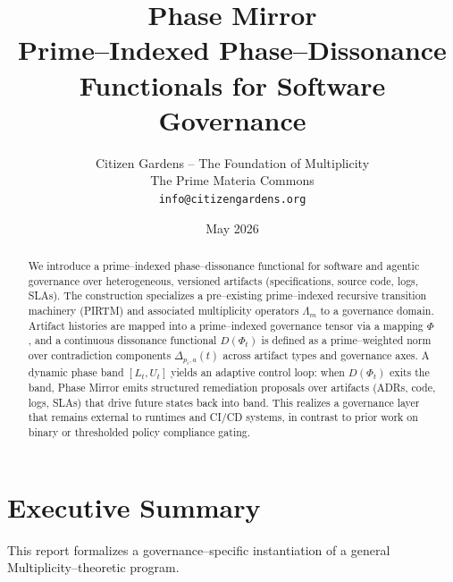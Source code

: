 \documentclass[11pt]{article}
\title{\Huge{Phase Mirror} \\ \Large\textbf{Prime–Indexed Phase--Dissonance} \\
\Large{Functionals for Software Governance}}
\author{Citizen Gardens -- The Foundation of Multiplicity\\
The Prime Materia Commons\\
\texttt{info@citizengardens.org}}
\date{May 2026}
\begin{document}
\maketitle
\begin{abstract}
We introduce a prime--indexed phase--dissonance functional for software and agentic governance over heterogeneous, versioned artifacts (specifications, source code, logs, SLAs). The construction specializes a pre--existing prime--indexed recursive transition machinery (PIRTM) and associated multiplicity operators $\Lambda_m$ to a governance domain. Artifact histories are mapped into a prime--indexed governance tensor via a mapping $\Phi$, and a continuous dissonance functional $D(\Phi_t)$ is defined as a prime--weighted norm over contradiction components $\Delta_{p_i,a}(t)$ across artifact types and governance axes. A dynamic phase band $[L_t,U_t]$ yields an adaptive control loop: when $D(\Phi_t)$ exits the band, Phase Mirror emits structured remediation proposals over artifacts (ADRs, code, logs, SLAs) that drive future states back into band. This realizes a governance layer that remains external to runtimes and CI/CD systems, in contrast to prior work on binary or thresholded policy compliance gating.
\end{abstract}
\newpage
\tableofcontents
\newpage
\section{Executive Summary}

This report formalizes a governance--specific instantiation of a general Multiplicity--theoretic program.
\end{document}
